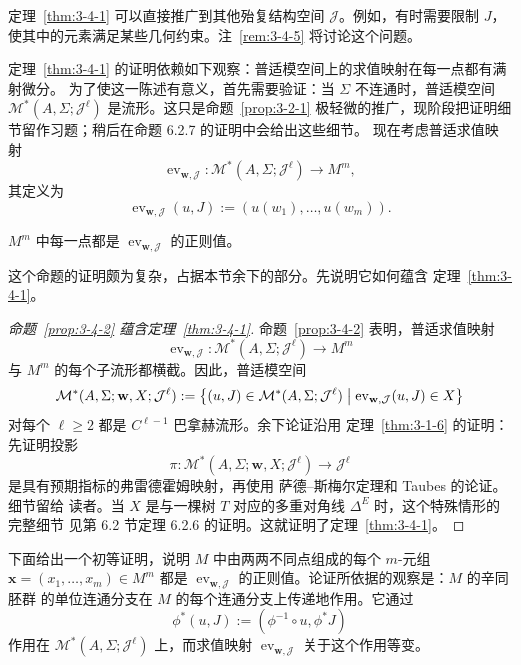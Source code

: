 定理~\ref{thm:3-4-1} 可以直接推广到其他殆复结构空间 $\mathcal J$。例如，有时需要限制
$J$，使其中的元素满足某些几何约束。注~\ref{rem:3-4-5} 将讨论这个问题。

定理~\ref{thm:3-4-1} 的证明依赖如下观察：普适模空间上的求值映射在每一点都有满射微分。
为了使这一陈述有意义，首先需要验证：当 $\Sigma$ 不连通时，普适模空间
$\mathcal M^*(A,\Sigma;\mathcal J^\ell)$ 是流形。这只是命题~\ref{prop:3-2-1}
极轻微的推广，现阶段把证明细节留作习题；稍后在命题 6.2.7 的证明中会给出这些细节。
现在考虑普适求值映射
\[
  \operatorname{ev}_{\mathbf w,\mathcal J}:
  \mathcal M^*(A,\Sigma;\mathcal J^\ell)\longrightarrow M^m,
\]
其定义为
\[
  \operatorname{ev}_{\mathbf w,\mathcal J}(u,J)
  :=(u(w_1),\ldots,u(w_m)).
\]

\begin{proposition}\label{prop:3-4-2}
$M^m$ 中每一点都是 $\operatorname{ev}_{\mathbf w,\mathcal J}$ 的正则值。
\end{proposition}

这个命题的证明颇为复杂，占据本节余下的部分。先说明它如何蕴含
定理~\ref{thm:3-4-1}。

\begin{proof}[命题~\ref{prop:3-4-2} 蕴含定理~\ref{thm:3-4-1}]
命题~\ref{prop:3-4-2} 表明，普适求值映射
\[
  \operatorname{ev}_{\mathbf w,\mathcal J}:
  \mathcal M^*(A,\Sigma;\mathcal J^\ell)\longrightarrow M^m
\]
与 $M^m$ 的每个子流形都横截。因此，普适模空间
\[
  \mathcal M^*(A,\Sigma;\mathbf w,X;\mathcal J^\ell)
  :=\bigl\{(u,J)\in\mathcal M^*(A,\Sigma;\mathcal J^\ell)
  \bigm|\operatorname{ev}_{\mathbf w,\mathcal J}(u,J)\in X\bigr\}
\]
对每个 $\ell\ge2$ 都是 $C^{\ell-1}$ 巴拿赫流形。余下论证沿用
定理~\ref{thm:3-1-6} 的证明：先证明投影
\[
  \pi:\mathcal M^*(A,\Sigma;\mathbf w,X;\mathcal J^\ell)
  \longrightarrow\mathcal J^\ell
\]
是具有预期指标的弗雷德霍姆映射，再使用 萨德--斯梅尔定理和 Taubes 的论证。细节留给
读者。当 $X$ 是与一棵树 $T$ 对应的多重对角线 $\Delta^E$ 时，这个特殊情形的完整细节
见第 6.2 节定理 6.2.6 的证明。这就证明了定理~\ref{thm:3-4-1}。
\end{proof}

下面给出一个初等证明，说明 $M$ 中由两两不同点组成的每个 $m$-元组
$\mathbf x=(x_1,\ldots,x_m)\in M^m$ 都是
$\operatorname{ev}_{\mathbf w,\mathcal J}$ 的正则值。论证所依据的观察是：$M$ 的辛同胚群
的单位连通分支在 $M$ 的每个连通分支上传递地作用。它通过
\[
  \phi^*(u,J):=(\phi^{-1}\circ u,\phi^*J)
\]
作用在 $\mathcal M^*(A,\Sigma;\mathcal J^\ell)$ 上，而求值映射
$\operatorname{ev}_{\mathbf w,\mathcal J}$ 关于这个作用等变。

